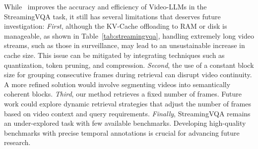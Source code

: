 While \ourmethod~improves the accuracy and efficiency of Video-LLMs in the StreamingVQA task, it still has several limitations that deserves future investigation:
{\em First}, although the KV-Cache offloading to RAM or disk is manageable, as shown in Table~\ref{tab:streamingvqa}, handling extremely long video streams, such as those in surveillance, may lead to an unsustainable increase in cache size. This issue can be mitigated by integrating techniques such as quantization, token pruning, and compression.
{\em Second}, the use of a constant block size for grouping consecutive frames during retrieval can disrupt video continuity. A more refined solution would involve segmenting videos into semantically coherent blocks.
{\em Third}, our method retrieves a fixed number of frames. Future work could explore dynamic retrieval strategies that adjust the number of frames based on video context and query requirements.
{\em Finally}, StreamingVQA remains an under-explored task with few available benchmarks. Developing high-quality benchmarks with precise temporal annotations is crucial for advancing future research.
